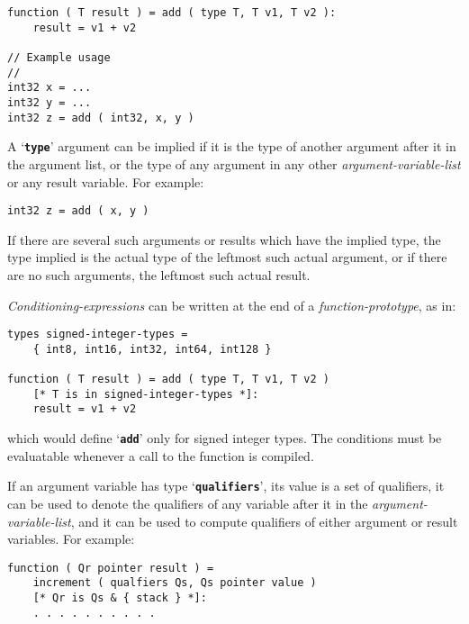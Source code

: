 \documentclass[12pt]{article}
\newcommand{\TT}[1]{{\tt \bfseries #1}}
\newenvironment{indpar}[1][0.3in]%
	{\begin{list}{}%
		     {\setlength{\itemsep}{0in}%
		      \setlength{\topsep}{0in}%
		      \setlength{\parsep}{1ex}%
		      \setlength{\labelwidth}{#1}%
		      \setlength{\leftmargin}{#1}%
		      \addtolength{\leftmargin}{\labelsep}}%
	 \item}%
	{\end{list}}
\begin{document}
\begin{indpar}\begin{verbatim}
function ( T result ) = add ( type T, T v1, T v2 ):
    result = v1 + v2

// Example usage
//
int32 x = ...
int32 y = ...
int32 z = add ( int32, x, y )
\end{verbatim}\end{indpar}

A `\TT{type}' argument can be implied if it is the type of another argument
after it in the argument list, or the type of
any argument in any other {\em argument-variable-list}
or any result variable.  For example:

\begin{indpar}\begin{verbatim}
int32 z = add ( x, y )
\end{verbatim}\end{indpar}

If there are several such arguments or results which have the implied
type, the type implied is the actual type of the leftmost such
actual argument, or if there are no such arguments,
the leftmost such actual result.

{\em Conditioning-expressions}
can be written at the end of a {\em function-prototype},
as in:
\begin{indpar}\begin{verbatim}
types signed-integer-types =
    { int8, int16, int32, int64, int128 }

function ( T result ) = add ( type T, T v1, T v2 )
    [* T is in signed-integer-types *]:
    result = v1 + v2
\end{verbatim}\end{indpar}

which would define `\TT{add}' only for signed integer types.
The conditions must be evaluatable whenever a call to the
function is compiled.

If an argument variable has type `\TT{qualifiers}',
its value is a set of qualifiers,
it can be used to denote the qualifiers of any variable
after it in the {\em argument-variable-list}, and it can be
used to compute qualifiers of either argument or result variables.
For example:
\begin{indpar}\begin{verbatim}
function ( Qr pointer result ) =
    increment ( qualfiers Qs, Qs pointer value )
    [* Qr is Qs & { stack } *]:
    . . . . . . . . . .
\end{verbatim}\end{indpar}
\end{document}
